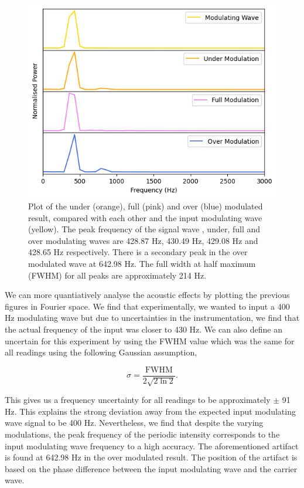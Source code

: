 \documentclass[aps,prl,reprint,10pt,amsmath,amssymb,superscriptaddress,a4paper]{revtex4-2}
\begin{document}
\begin{figure}
    \includegraphics[width = 12cm]{../Figures/comparefft.png}
    \caption{Plot of the under (orange), full (pink) and over (blue) modulated result, compared with each other 
    and the input modulating wave (yellow). The peak frequency of the signal wave , under, full and over modulating 
    waves are 428.87 Hz, 430.49 Hz, 429.08 Hz and 428.65 Hz respectively. There is a secondary peak in the over modulated 
    wave at 642.98 Hz. The full width at half maximum (FWHM) for all peaks are approximately 214 Hz.}
    \label{fig:compare}
\end{figure}

We can more quantiatively analyse the acoustic effects by plotting the previous figures in Fourier space. We find that experimentally, we wanted to input a 400 Hz modulating wave but due to 
uncertainties in the instrumentation, we find that the actual frequency of the input was closer to 430 Hz. We can also define an uncertain for this experiment by using the FWHM value which 
was the same for all readings using the following Gaussian assumption,

\begin{equation}
    \sigma = \frac{\text{FWHM}}{2\sqrt{2\ln{2}}}.
\end{equation}

This gives us a frequency uncertainty for all readings to be approximately $\pm$ 91 Hz. This explains the strong deviation away from the expected input modulating wave signal to be 400 Hz.
Nevertheless, we find that despite the varying modulations, the peak frequency of the periodic intensity corresponds to the input modulating wave frequency to a high accuracy. The aforementioned 
artifact is found at 642.98 Hz in the over modulated result. The position of the artifact is based on the phase difference between the input modulating wave and the carrier wave.
\end{document}
